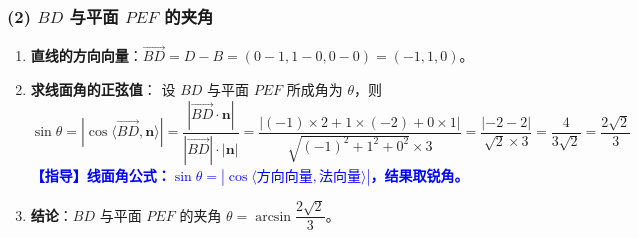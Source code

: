 \documentclass{article}
\newcommand{\comment}[1]{\textcolor{blue}{\small\textbf{【指导】#1}}}
\begin{document}
	\subsubsection*{(2) $BD$ 与平面 $PEF$ 的夹角}
	
	\begin{enumerate}[label=\textbf{\arabic*.},leftmargin=*]
		\item \textbf{直线的方向向量}：$\overrightarrow{BD} = D - B = (0-1,1-0,0-0) = (-1,1,0)$。
		
		\item \textbf{求线面角的正弦值}：
		设 $BD$ 与平面 $PEF$ 所成角为 $\theta$，则
		\[
		\sin\theta = |\cos\langle \overrightarrow{BD}, \boldsymbol{n} \rangle|
		= \frac{|\overrightarrow{BD} \cdot \boldsymbol{n}|}{|\overrightarrow{BD}| \cdot |\boldsymbol{n}|}
		= \frac{|(-1)\times2 + 1\times(-2) + 0\times1|}{\sqrt{(-1)^2+1^2+0^2} \times 3}
		= \frac{|-2-2|}{\sqrt{2} \times 3}
		= \frac{4}{3\sqrt{2}} = \frac{2\sqrt{2}}{3}
		\]
		\comment{线面角公式：$\sin\theta = |\cos\langle \text{方向向量}, \text{法向量} \rangle|$，结果取锐角。}
		
		\item \textbf{结论}：$BD$ 与平面 $PEF$ 的夹角 $\theta = \arcsin\dfrac{2\sqrt{2}}{3}$。
	\end{enumerate}
	
\end{document}
